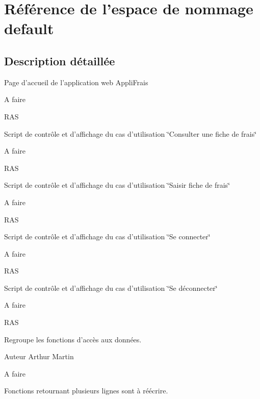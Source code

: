 \hypertarget{namespacedefault}{\section{Référence de l'espace de nommage default}
\label{namespacedefault}
}


\subsection{Description détaillée}
Page d'accueil de l'application web Appli\-Frais

\begin{DoxyRefDesc}{A faire}
\item[\hyperlink{todo__todo000001}{A faire}]R\-A\-S \end{DoxyRefDesc}


Script de contrôle et d'affichage du cas d'utilisation \char`\"{}\-Consulter une fiche de frais\char`\"{}

\begin{DoxyRefDesc}{A faire}
\item[\hyperlink{todo__todo000002}{A faire}]R\-A\-S \end{DoxyRefDesc}


Script de contrôle et d'affichage du cas d'utilisation \char`\"{}\-Saisir fiche de frais\char`\"{}

\begin{DoxyRefDesc}{A faire}
\item[\hyperlink{todo__todo000003}{A faire}]R\-A\-S \end{DoxyRefDesc}


Script de contrôle et d'affichage du cas d'utilisation \char`\"{}\-Se connecter\char`\"{}

\begin{DoxyRefDesc}{A faire}
\item[\hyperlink{todo__todo000004}{A faire}]R\-A\-S \end{DoxyRefDesc}


Script de contrôle et d'affichage du cas d'utilisation \char`\"{}\-Se déconnecter\char`\"{}

\begin{DoxyRefDesc}{A faire}
\item[\hyperlink{todo__todo000005}{A faire}]R\-A\-S \end{DoxyRefDesc}


Regroupe les fonctions d'accès aux données.

\begin{DoxyAuthor}{Auteur}
Arthur Martin 
\end{DoxyAuthor}
\begin{DoxyRefDesc}{A faire}
\item[\hyperlink{todo__todo000006}{A faire}]Fonctions retournant plusieurs lignes sont à réécrire. \end{DoxyRefDesc}


